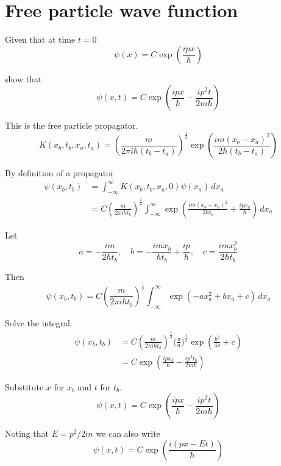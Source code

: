 


\section*{Free particle wave function}

Given that at time $t=0$
\begin{equation*}
\psi(x)=C\exp\left(\frac{ipx}{\hbar}\right)
\end{equation*}

show that
\begin{equation*}
\psi(x,t)=C\exp\left(\frac{ipx}{\hbar}-\frac{ip^2t}{2m\hbar}\right)
\end{equation*}

This is the free particle propagator.
\begin{equation*}
K(x_b,t_b,x_a,t_a)=\left(\frac{m}{2\pi i\hbar(t_b-t_a)}\right)^\frac{1}{2}
\exp\left(\frac{im(x_b-x_a)^2}{2\hbar(t_b-t_a)}\right)
\end{equation*}

By definition of a propagator
\begin{align*}
\psi(x_b,t_b)&=\int_{-\infty}^\infty K(x_b,t_b,x_a,0)\psi(x_a)\,dx_a
\\
&=C\left(\frac{m}{2\pi i\hbar t_b}\right)^\frac{1}{2}
\int_{-\infty}^\infty
\exp\left(\frac{im(x_b-x_a)^2}{2\hbar t_b}+\frac{ipx_a}{\hbar}\right)\,dx_a
\end{align*}

Let
\begin{equation*}
a=-\frac{im}{2\hbar t_b},\quad
b=-\frac{imx_b}{\hbar t_b}+\frac{ip}{\hbar},\quad
c=\frac{imx_b^2}{2\hbar t_b}
\end{equation*}

Then
\begin{equation*}
\psi(x_b,t_b)
=C\left(\frac{m}{2\pi i\hbar t_b}\right)^\frac{1}{2}
\int_{-\infty}^\infty
\exp(-ax_a^2+bx_a+c)\,dx_a
\tag{1}
\end{equation*}

Solve the integral.
\begin{align*}
\psi(x_b,t_b)&=C\left(\frac{m}{2\pi i\hbar t_b}\right)^\frac{1}{2}
\biggl(\frac{\pi}{a}\biggr)^\frac{1}{2}\exp\left(\frac{b^2}{4a}+c\right)
\\
&=C\exp\left(\frac{ipx_b}{\hbar}-\frac{ip^2t_b}{2m\hbar}\right)\tag{2}
\end{align*}

Substitute $x$ for $x_b$ and $t$ for $t_b$.
\begin{equation*}
\psi(x,t)=C\exp\left(\frac{ipx}{\hbar}-\frac{ip^2t}{2m\hbar}\right)
\end{equation*}

Noting that $E=p^2/2m$ we can also write
\begin{equation*}
\psi(x,t)=C\exp\left(\frac{i(px-Et)}{\hbar}\right)
\end{equation*}


